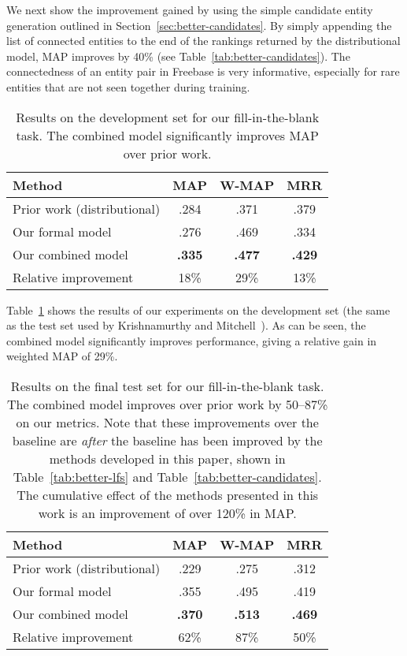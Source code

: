 \documentclass[11pt]{article}
\newcommand{\secref}[1]{Section~\ref{sec:#1}}
\newcommand{\tabref}[1]{Table~\ref{tab:#1}}
\begin{document}
We next show the improvement gained by using the simple candidate
entity generation outlined in \secref{better-candidates}.  By simply
appending the list of connected entities to the end of the rankings
returned by the distributional model, MAP improves by 40\% (see
\tabref{better-candidates}).  The connectedness of an entity pair in
Freebase is very informative, especially for rare entities that are
not seen together during training.

\begin{table}
  \centering
  {\small
    \begin{tabular}{lccc}
      \toprule
      Method & MAP & W-MAP & MRR \\
      \midrule
      Prior work (distributional) & .284 & .371 & .379 \\
      \midrule
      Our formal model & .276 & .469 & .334 \\
      \midrule
      Our combined model & \textbf{.335} & \textbf{.477} & \textbf{.429} \\
      \bottomrule
      Relative improvement & 18\% & 29\% & 13\% \\
      \bottomrule
    \end{tabular}
  }
  \caption{Results on the development set for our fill-in-the-blank task.  The
  combined model significantly improves MAP over prior work.}
  \label{tab:dev-results}
\end{table}

\tabref{dev-results} shows the results of our experiments on the
development set (the same as the test set used by Krishnamurthy and
Mitchell~).  As
can be seen, the combined model significantly improves performance,
giving a relative gain in weighted MAP of 29\%.

\begin{table}
  \centering
  {\small
    \begin{tabular}{lccc}
      \toprule
      Method & MAP & W-MAP & MRR \\
      \midrule
      Prior work (distributional) & .229 & .275 & .312 \\
      \midrule
      Our formal model & .355 & .495 & .419 \\
      \midrule
      Our combined model & \textbf{.370} & \textbf{.513} & \textbf{.469} \\
      \bottomrule
      Relative improvement & 62\% & 87\% & 50\% \\
      \bottomrule
    \end{tabular}
  }
  \caption{Results on the final test set for our fill-in-the-blank
  task.  The combined model improves over prior work by 50--87\% on
  our metrics.  Note that these improvements over the baseline are
  \emph{after} the baseline has been improved by the methods developed
  in this paper, shown in \tabref{better-lfs} and
  \tabref{better-candidates}.  The cumulative effect of the methods
  presented in this work is an improvement of over 120\% in MAP.}
  \label{tab:final-results}
\end{table}
\end{document}
